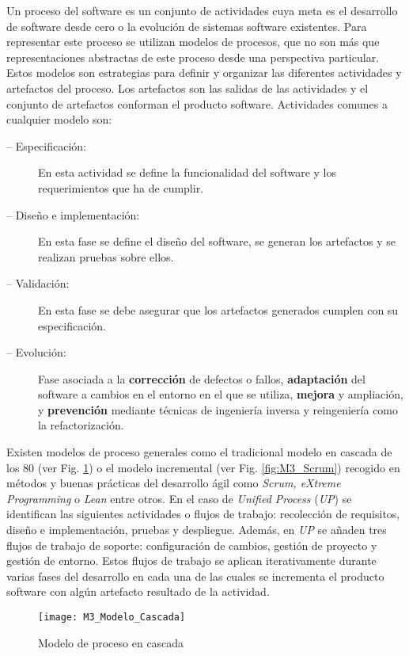 Un proceso del software es un conjunto de actividades cuya meta es el desarrollo de software desde cero o la evolución de sistemas software existentes. Para representar este proceso se utilizan modelos de procesos, que no son más que representaciones abstractas de este proceso desde una perspectiva particular. Estos modelos son estrategias para definir y organizar las diferentes actividades y artefactos del proceso. Los artefactos son las salidas de las actividades y el conjunto de artefactos conforman el producto software. Actividades comunes a cualquier modelo son:
\begin{description}
	\item[-- Especificación:] En esta actividad se define la funcionalidad del software y los requerimientos que ha de cumplir.
	\item[-- Diseño e implementación:] En esta fase se define el diseño del software, se generan los artefactos y se realizan pruebas sobre ellos.
	\item[-- Validación:] En esta fase se debe asegurar que los artefactos generados cumplen con su especificación.
	\item[-- Evolución:] Fase asociada a la \textbf{corrección} de defectos o fallos, \textbf{adaptación} del software a cambios en el entorno en el que se utiliza, \textbf{mejora} y ampliación, y \textbf{prevención} mediante técnicas de ingeniería inversa y reingeniería como la refactorización.
\end{description}

Existen modelos de proceso generales como el tradicional modelo en cascada de los 80 (ver Fig. \ref{fig:M3_Modelo_Cascada}) o el modelo incremental (ver Fig. \ref{fig:M3_Scrum}) recogido en métodos y buenas prácticas del desarrollo ágil \cite{scrum_master_scrum_2019} como \textit{Scrum, eXtreme Programming} o \textit{Lean} entre otros. En el caso de  \textit{Unified Process} (\textit{UP}) \cite{jacobson_proceso_2000} se identifican las siguientes actividades o flujos de trabajo: recolección de requisitos, diseño e implementación, pruebas y despliegue. Además, en \textit{UP} se añaden tres flujos de trabajo de soporte: configuración de cambios, gestión de proyecto y gestión de entorno. Estos flujos de trabajo se aplican iterativamente durante varias fases del desarrollo en cada una de las cuales se incrementa el producto software con algún artefacto resultado de la actividad.

\begin{figure}[!h]
	\centering
	\texttt{[image: M3\_Modelo\_Cascada]}
	\caption{Modelo de proceso en cascada \cite{wikipedia_software_2019}}
	\label{fig:M3_Modelo_Cascada}
\end{figure}
\FloatBarrier

